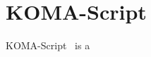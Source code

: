 \documentclass[master.tex]{subfiles}
\begin{document}
\chapter{KOMA-Script}

KOMA-Script~\cite{komascript} is a 
\end{document}
